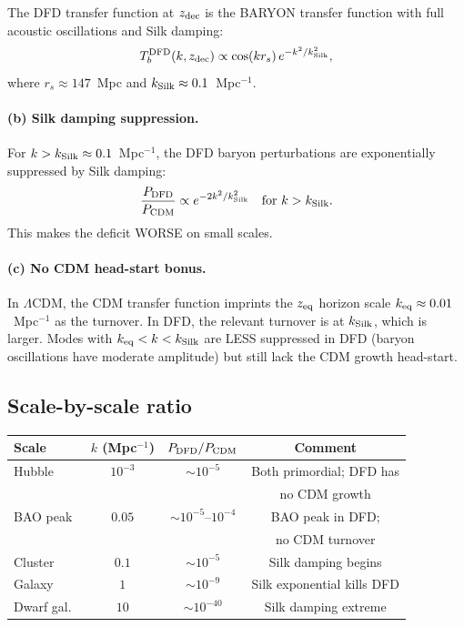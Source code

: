 \documentclass[aps,prd,twocolumn,nofootinbib]{revtex4-2}
\newcommand{\LCDM}{$\Lambda$CDM}
\newcommand{\keq}{k_{\rm eq}}
\newcommand{\kSilk}{k_{\rm Silk}}
\begin{document}
The DFD transfer function at $z_{\rm dec}$ is the BARYON transfer
function with full acoustic oscillations and Silk damping:
\begin{equation}
T_b^{\rm DFD}(k, z_{\rm dec}) \propto
\cos(kr_s)\,e^{-k^2/k_{\rm Silk}^2},
\end{equation}
where $r_s \approx 147$~Mpc and $\kSilk \approx 0.1$~Mpc$^{-1}$.

\paragraph{(b) Silk damping suppression.}
For $k > \kSilk \approx 0.1$~Mpc$^{-1}$, the DFD baryon
perturbations are exponentially suppressed by Silk damping:
\begin{equation}
\frac{P_{\rm DFD}}{P_{\rm CDM}} \propto e^{-2k^2/k_{\rm Silk}^2}
\quad \text{for } k > \kSilk.
\end{equation}
This makes the deficit WORSE on small scales.

\paragraph{(c) No CDM head-start bonus.}
In \LCDM, the CDM transfer function imprints the $z_{\rm eq}$
horizon scale $\keq \approx 0.01$~Mpc$^{-1}$ as the turnover.
In DFD, the relevant turnover is at $\kSilk$, which is larger.
Modes with $\keq < k < \kSilk$ are LESS suppressed in DFD
(baryon oscillations have moderate amplitude) but still lack the
CDM growth head-start.

\subsection{Scale-by-scale ratio}

\begin{center}
\begin{tabular}{lccc}
\toprule
Scale & $k$ (Mpc$^{-1}$) & $P_{\rm DFD}/P_{\rm CDM}$ & Comment \\
\midrule
Hubble & $10^{-3}$ & $\sim 10^{-5}$ & Both primordial; DFD has \\
 & & & no CDM growth \\
BAO peak & $0.05$ & $\sim 10^{-5}$--$10^{-4}$ & BAO peak in DFD; \\
 & & & no CDM turnover \\
Cluster & $0.1$ & $\sim 10^{-5}$ & Silk damping begins \\
Galaxy & $1$ & $\sim 10^{-9}$ & Silk exponential kills DFD \\
Dwarf gal.\ & $10$ & $\sim 10^{-40}$ & Silk damping extreme \\
\bottomrule
\end{tabular}
\end{center}
\end{document}
